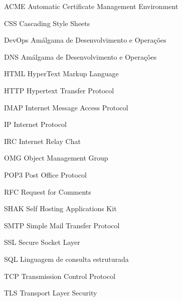 \begin{siglas}
  \item[ACME] Automatic Certificate Management Environment
  \item[CSS] Cascading Style Sheets
  \item[DevOps] Amálgama de Desenvolvimento e Operações
  \item[DNS] Amálgama de Desenvolvimento e Operações
  \item[HTML] HyperText Markup Language
  \item[HTTP] Hypertext Transfer Protocol
  \item[IMAP] Internet Message Access Protocol
  \item[IP] Internet Protocol
  \item[IRC] Internet Relay Chat
  \item[OMG] Object Management Group
  \item[POP3] Post Office Protocol 
  \item[RFC] Request for Comments
  \item[SHAK] Self Hosting Applications Kit
  \item[SMTP] Simple Mail Transfer Protocol
  \item[SSL] Secure Socket Layer
  \item[SQL] Linguagem de consulta estruturada
  \item[TCP] Transmission Control Protocol 
  \item[TLS] Transport Layer Security
\end{siglas}
